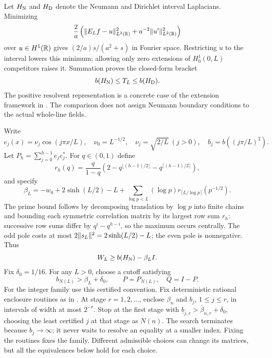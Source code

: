 Let $H_{\rm N}$ and $H_{\rm D}$ denote the Neumann and Dirichlet interval
Laplacians. Minimizing
\[
\frac2a\left(\lVert E_Lf-u\rVert_{L^2(\mathbb R)}^2+a^{-2}\lVert u'\rVert_{L^2(\mathbb R)}^2\right)
\]
over $u\in H^1(\mathbb R)$ gives $(2/a)s/(a^2+s)$ in Fourier space.
Restricting $u$ to the interval lowers this minimum; allowing only zero
extensions of $H_0^1(0,L)$ competitors raises it. Summation proves the
closed-form bracket
\begin{equation}\label{eq:bracket}
b(H_{\rm N})\le T_L\le b(H_{\rm D}).
\end{equation}
The positive resolvent representation is a concrete case of the extension
framework in \cite{KM}. The comparison does not assign Neumann boundary
conditions to the actual whole-line fields.

Write
\[
e_j(x)=\nu_j\cos(j\pi x/L),\quad
\nu_0=L^{-1/2},\quad\nu_j=\sqrt{2/L}\ (j>0),\quad
b_j=b((j\pi/L)^2).
\]
Let $P_h=\sum_{j=0}^{h-1}e_je_j^*$. For $q\in(0,1)$ define
\[
r_h(q)=\frac{q}{1-q}
\left(2-q^{\lfloor(h-1)/2\rfloor}-q^{\lceil(h-1)/2\rceil}\right),
\]
and specify
\begin{equation}\label{eq:beta}
\beta_L=-w_0+2\sinh(L/2)-L+
\sum_{\log p<L}(\log p)r_{\lceil L/\log p\rceil}(p^{-1/2}).
\end{equation}
The prime bound follows by decomposing translation by $\log p$ into finite
chains and bounding each symmetric correlation matrix by its largest row
sum $r_h$: successive row sums differ by $q^i-q^{h-i}$, so the
maximum occurs centrally. The odd pole costs at most $2\lVert s_L\rVert^2=2\sinh(L/2)-L$;
the even pole is nonnegative. Thus
\begin{equation}\label{eq:lower}
W_L\ge b(H_{\rm N})-\beta_LI.
\end{equation}
Fix $\delta_0=1/16$. For any $L>0$, choose a cutoff satisfying
\begin{equation}\label{eq:N}
b_{N(L)}>\beta_L+\delta_0,\qquad P=P_{N(L)},\quad Q=I-P.
\end{equation}
For the integer family use this certified convention. Fix deterministic
rational enclosure routines as in \cite[Section 4]{Companion}. At stage
$r=1,2,\ldots$, enclose $\beta_n$ and $b_j$, $1\le j\le r$, in intervals
of width at most $2^{-r}$. Stop at the first stage with
$\underline b_{j,r}>\overline\beta_{n,r}+\delta_0$, choosing the least
certified $j$ at that stage as $N(n)$. The search terminates because
$b_j\to\infty$; it never waits to resolve an equality at a smaller index.
Fixing the routines fixes the family. Different admissible choices can
change its matrices, but all the equivalences below hold for each choice.

